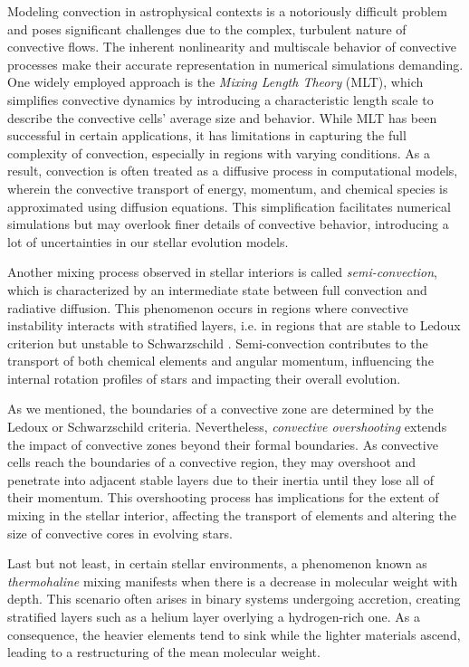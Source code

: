 \documentclass[main.tex]{subfiles}
\begin{document}
    Modeling convection in astrophysical contexts is a notoriously difficult problem and poses significant challenges due to the complex, turbulent nature of convective flows. The inherent nonlinearity and multiscale behavior of convective processes make their accurate representation in numerical simulations demanding. One widely employed approach is the \textit{Mixing Length Theory} (MLT), which simplifies convective dynamics by introducing a characteristic length scale to describe the convective cells' average size and behavior. While MLT has been successful in certain applications, it has limitations in capturing the full complexity of convection, especially in regions with varying conditions. As a result, convection is often treated as a diffusive process in computational models, wherein the convective transport of energy, momentum, and chemical species is approximated using diffusion equations. This simplification facilitates numerical simulations but may overlook finer details of convective behavior, introducing a lot of uncertainties in our stellar evolution models.

    Another mixing process observed in stellar interiors is called \textit{semi-convection}, which is characterized by an intermediate state between full convection and radiative diffusion. This phenomenon occurs in regions where convective instability interacts with stratified layers, i.e. in regions that are stable to Ledoux criterion but unstable to Schwarzschild \citep[see][]{spruit:semiconvection}. Semi-convection contributes to the transport of both chemical elements and angular momentum, influencing the internal rotation profiles of stars and impacting their overall evolution.

    As we mentioned, the boundaries of a convective zone are determined by the Ledoux or Schwarzschild criteria. Nevertheless, \textit{convective overshooting} extends the impact of convective zones beyond their formal boundaries. As convective cells reach the boundaries of a convective region, they may overshoot and penetrate into adjacent stable layers due to their inertia until they lose all of their momentum. This overshooting process has implications for the extent of mixing in the stellar interior, affecting the transport of elements and altering the size of convective cores in evolving stars.
    
    Last but not least, in certain stellar environments, a phenomenon known as \textit{thermohaline} mixing manifests when there is a decrease in molecular weight with depth. This scenario often arises in binary systems undergoing accretion, creating stratified layers such as a helium layer overlying a hydrogen-rich one. As a consequence, the heavier elements tend to sink while the lighter materials ascend, leading to a restructuring of the mean molecular weight.
\end{document}
